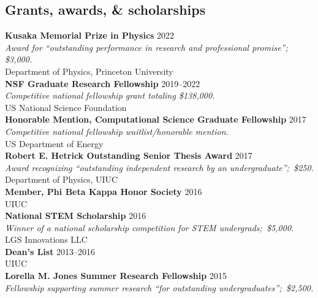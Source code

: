 \documentclass[margin,line,11pt]{resume}
\edef\hs{\string;} %
\begin{document}
\begin{resume}
\section{\mysidestyle Grants, awards, \& scholarships}

\textbf{Kusaka Memorial Prize in Physics} \hfill 2022 \\
\textit{Award for ``outstanding performance in research and professional promise''\hs\, \$3,000.} \\
Department of Physics, Princeton University\vspace{2mm} \\
\textbf{NSF Graduate Research Fellowship} \hfill 2019--2022 \\
\textit{Competitive national fellowship grant totaling \$138,000.}\\
US National Science Foundation\vspace{2mm} \\
\textbf{Honorable Mention, Computational Science Graduate Fellowship} \hfill 2017 \\
\textit{Competitive national fellowship waitlist/honorable mention.} \\
US Department of Energy\vspace{2mm} \\
\textbf{Robert E. Hetrick Outstanding Senior Thesis Award} \hfill 2017 \\
\textit{Award recognizing ``outstanding independent research by an undergraduate''\hs\, \$250.} \\
Department of Physics, UIUC\vspace{2mm} \\
\clearpage
\textbf{Member, Phi Beta Kappa Honor Society} \hfill 2016 \\
UIUC\vspace{2mm} \\
\textbf{National STEM Scholarship} \hfill 2016 \\
\textit{Winner of a national scholarship competition for STEM undergrads\hs\, \$5,000.} \\
LGS Innovations LLC\vspace{2mm} \\
\textbf{Dean's List} \hfill 2013--2016 \\
UIUC\vspace{2mm} \\
\textbf{Lorella M. Jones Summer Research Fellowship} \hfill 2015 \\
\textit{Fellowship supporting summer research ``for outstanding undergraduates''\hs\, \$2,500.}\\

\end{resume}
\end{document}
